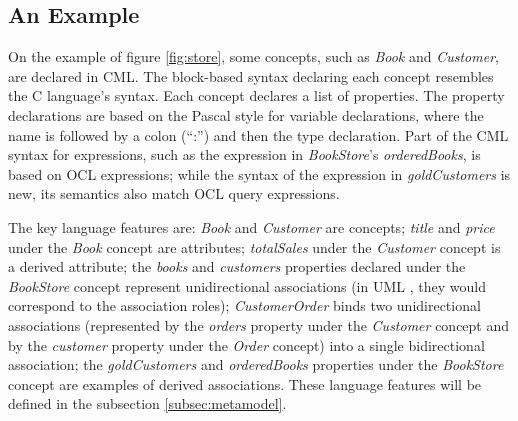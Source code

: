 \subsection{An Example}\label{subsec:example}

On the example of figure \ref{fig:store}, some concepts, such as \emph{Book} and \emph{Customer}, are declared in CML.
The block-based syntax declaring each concept resembles the C \cite{clang} language's syntax.
Each concept declares a list of properties.
The property declarations are based on the Pascal \cite{pascal} style for variable declarations,
where the name is followed by a colon (``:'') and then the type declaration.
Part of the CML syntax for expressions, such as the expression in \emph{BookStore}'s \emph{orderedBooks}, is based on OCL \cite{ocl} expressions; while the syntax of the expression in \emph{goldCustomers} is new, its semantics also match OCL \cite{ocl} query expressions.



The key language features are:
\emph{Book} and \emph{Customer} are concepts;
\emph{title} and \emph{price} under the \emph{Book} concept are attributes;
\emph{totalSales} under the \emph{Customer} concept is a derived attribute;
the \emph{books} and \emph{customers} properties declared under the \emph{BookStore} concept represent unidirectional associations (in UML \cite{uml}, they would correspond to the association roles);
\emph{CustomerOrder} binds two unidirectional associations
(represented by the \emph{orders} property under the \emph{Customer} concept
and by the \emph{customer} property under the \emph{Order} concept)
into a single bidirectional association;
the \emph{goldCustomers} and \emph{orderedBooks} properties under the \emph{BookStore} concept are examples of derived associations. These language features will be defined in the subsection \ref{subsec:metamodel}.
